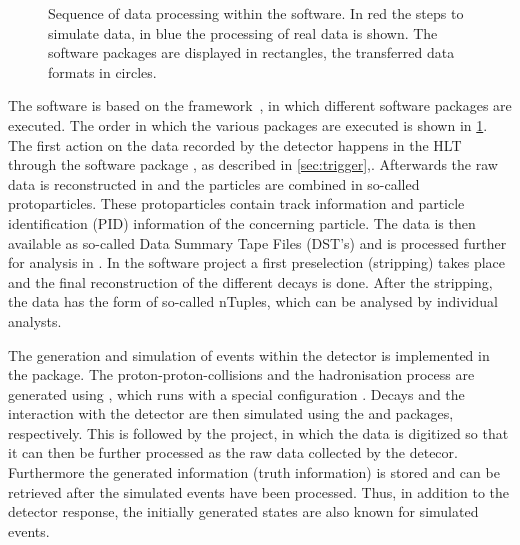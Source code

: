 \begin{figure}[tbp]
    \centering
    
    \caption{Sequence of data processing within the \lhcb software.
    In red the steps to simulate data, in blue the processing of real data is shown.
    The software packages are displayed in rectangles, the transferred data formats in circles.}
    \label{fig:lhcbsoftware}
\end{figure}
The \lhcb software is based on the \gaudi framework~\cite{Barrand:2001ny}, in which different software packages are executed.
The order in which the various packages are executed is shown in \cref{fig:lhcbsoftware}.
The first action on the data recorded by the detector happens in the HLT through the software package \moore \cite{Aaij:2012me, Albrecht:2013fba}, as described in \cref{sec:trigger},.
Afterwards the raw data is reconstructed in \brunel \cite{Szumlak:2007zz, VanderEijk:2001wqa, Kucharczyk:1756296} and the particles are combined in so-called protoparticles.
These protoparticles contain track information and particle identification (PID) information of the concerning particle.
The data is then available as so-called Data Summary Tape Files (DST's) and is processed further for analysis in \davinci.
In the \davinci software project a first preselection (stripping) takes place and the final reconstruction of the different decays is done.
After the stripping, the data has the form of so-called nTuples, which can be analysed by individual analysts.

The generation and simulation of events within the \lhcb detector is implemented in the \gauss package.
The proton-proton-collisions and the hadronisation process are generated using \pythia \cite{pythia6, pythia8}, which runs with a special \lhcb configuration \cite{LHCb-PROC-2010-056}.
Decays and the interaction with the detector are then simulated using the \evtgen \cite{evtgen} and \geant \cite{geant1, geant2} packages, respectively.
This is followed by the \boole project, in which the data is digitized so that it can then be further processed as the raw data collected by the detecor.
Furthermore the generated information (truth information) is stored and can be retrieved after the simulated events have been processed.
Thus, in addition to the detector response, the initially generated states are also known for simulated events.
